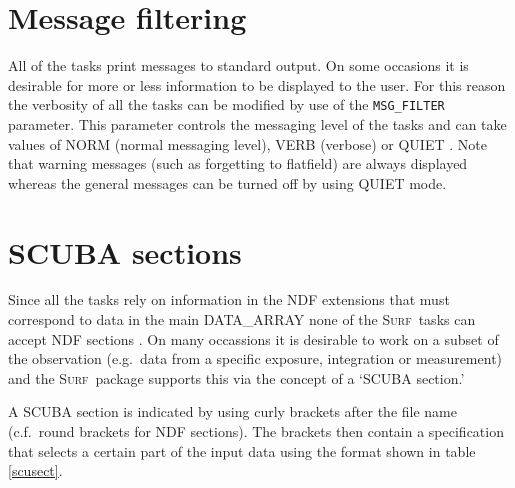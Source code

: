\documentclass[twoside,11pt]{starlink}
\providecommand{\scusoft}          {\textsc{Surf}}
\providecommand{\param}[1]{\texttt{#1}}
\begin{document}
\section{Message filtering}

All of the tasks print messages to standard output. On some occasions it
is desirable for more or less information to be displayed to the user.
For this reason the verbosity of all the tasks can be modified by use of
the \param{MSG\_FILTER} parameter. This parameter controls the messaging
level of the tasks and can take values of NORM (normal messaging level),
VERB (verbose) or QUIET \cite{mers}. Note that warning messages (such
as forgetting to flatfield) are always displayed whereas the general messages
can be turned off by using QUIET mode.


\section{SCUBA sections\label{sections}}

Since all the tasks rely on information in the NDF
extensions that must correspond to data in the main DATA\_ARRAY none of the
\scusoft\ tasks can accept NDF sections \cite{ndf}. On many occassions it
is desirable to work on a subset of the observation (e.g.\ data from a
specific exposure, integration or measurement) and the \scusoft\ package
supports this via the concept of a `SCUBA section.'

A SCUBA section is indicated by using curly brackets after the file
name (c.f.\ round brackets for NDF sections). The brackets then contain
a specification that selects a certain part of the input data
using the format shown in table \ref{scusect}.
\end{document}
